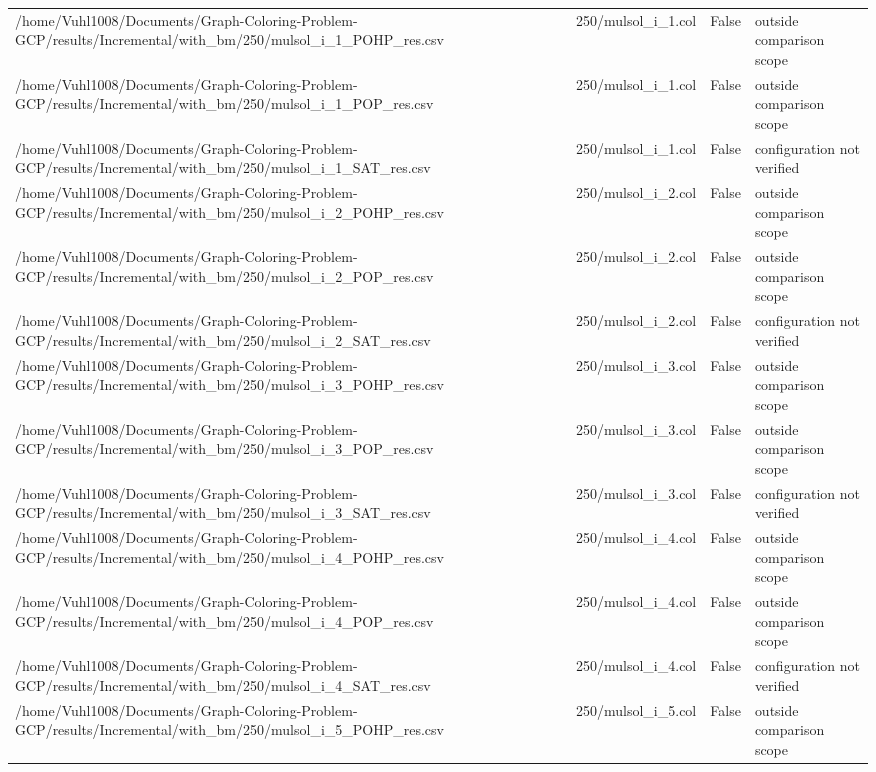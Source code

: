 \begin{table}[htbp]
\begin{tabular}{llll}
/home/Vuhl1008/Documents/Graph-Coloring-Problem-GCP/results/Incremental/with\_bm/250/mulsol\_i\_1\_POHP\_res.csv & 250/mulsol\_i\_1.col & False & outside comparison scope \\
/home/Vuhl1008/Documents/Graph-Coloring-Problem-GCP/results/Incremental/with\_bm/250/mulsol\_i\_1\_POP\_res.csv & 250/mulsol\_i\_1.col & False & outside comparison scope \\
/home/Vuhl1008/Documents/Graph-Coloring-Problem-GCP/results/Incremental/with\_bm/250/mulsol\_i\_1\_SAT\_res.csv & 250/mulsol\_i\_1.col & False & configuration not verified \\
/home/Vuhl1008/Documents/Graph-Coloring-Problem-GCP/results/Incremental/with\_bm/250/mulsol\_i\_2\_POHP\_res.csv & 250/mulsol\_i\_2.col & False & outside comparison scope \\
/home/Vuhl1008/Documents/Graph-Coloring-Problem-GCP/results/Incremental/with\_bm/250/mulsol\_i\_2\_POP\_res.csv & 250/mulsol\_i\_2.col & False & outside comparison scope \\
/home/Vuhl1008/Documents/Graph-Coloring-Problem-GCP/results/Incremental/with\_bm/250/mulsol\_i\_2\_SAT\_res.csv & 250/mulsol\_i\_2.col & False & configuration not verified \\
/home/Vuhl1008/Documents/Graph-Coloring-Problem-GCP/results/Incremental/with\_bm/250/mulsol\_i\_3\_POHP\_res.csv & 250/mulsol\_i\_3.col & False & outside comparison scope \\
/home/Vuhl1008/Documents/Graph-Coloring-Problem-GCP/results/Incremental/with\_bm/250/mulsol\_i\_3\_POP\_res.csv & 250/mulsol\_i\_3.col & False & outside comparison scope \\
/home/Vuhl1008/Documents/Graph-Coloring-Problem-GCP/results/Incremental/with\_bm/250/mulsol\_i\_3\_SAT\_res.csv & 250/mulsol\_i\_3.col & False & configuration not verified \\
/home/Vuhl1008/Documents/Graph-Coloring-Problem-GCP/results/Incremental/with\_bm/250/mulsol\_i\_4\_POHP\_res.csv & 250/mulsol\_i\_4.col & False & outside comparison scope \\
/home/Vuhl1008/Documents/Graph-Coloring-Problem-GCP/results/Incremental/with\_bm/250/mulsol\_i\_4\_POP\_res.csv & 250/mulsol\_i\_4.col & False & outside comparison scope \\
/home/Vuhl1008/Documents/Graph-Coloring-Problem-GCP/results/Incremental/with\_bm/250/mulsol\_i\_4\_SAT\_res.csv & 250/mulsol\_i\_4.col & False & configuration not verified \\
/home/Vuhl1008/Documents/Graph-Coloring-Problem-GCP/results/Incremental/with\_bm/250/mulsol\_i\_5\_POHP\_res.csv & 250/mulsol\_i\_5.col & False & outside comparison scope \\

\end{tabular}
\end{table}
